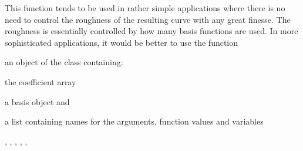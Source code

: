 \documentclass{article}
\begin{document}
\begin{Details}\relax
This function tends to be used in rather simple applications where
there is no need to control the roughness of the resulting curve
with any great finesse.  The roughness is essentially controlled
by how many basis functions are used.  In more sophisticated
applications, it would be better to use the function 
\end{Details}
\begin{Value}
an object of the  class containing:

\begin{ldescription}
\item[\code{coefs}] the coefficient array

\item[\code{basis}] a basis object and

\item[\code{fdnames}] a list containing names for the arguments, function values
and variables

\end{ldescription}
\end{Value}
\begin{SeeAlso}\relax
{}
, 
, 
, 
, 
, 
\end{SeeAlso}
\end{document}
